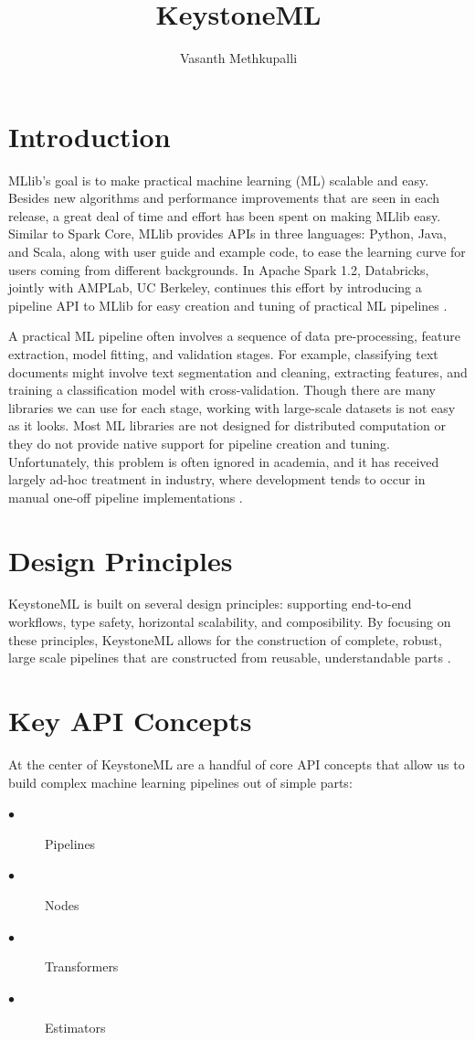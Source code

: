 \documentclass[9pt,twocolumn,twoside]{../../styles/osajnl}
\title{KeystoneML}
\author[1,*]{Vasanth Methkupalli}
\affil[1]{School of Informatics and Computing, Bloomington, IN 47408, U.S.A.}
\affil[*]{Corresponding authors: mvasanthiiit@gmail.com}
\begin{document}
\maketitle

\section{Introduction}

MLlib’s goal is to make practical machine learning (ML) scalable and
easy. Besides new algorithms and performance improvements that are
seen in each release, a great deal of time and effort has been spent
on making MLlib easy. Similar to Spark Core, MLlib provides APIs in
three languages: Python, Java, and Scala, along with user guide and
example code, to ease the learning curve for users coming from
different backgrounds. In Apache Spark 1.2, Databricks, jointly with
AMPLab, UC Berkeley, continues this effort by introducing a pipeline
API to MLlib for easy creation and tuning of practical ML
pipelines \cite{meng2016mllib} .

A practical ML pipeline often involves a sequence of data
pre-processing, feature extraction, model fitting, and validation
stages. For example, classifying text documents might involve text
segmentation and cleaning, extracting features, and training a
classification model with cross-validation. Though there are many
libraries we can use for each stage, working with large-scale datasets
is not easy as it looks. Most ML libraries are not designed for
distributed computation or they do not provide native support for
pipeline creation and tuning. Unfortunately, this problem is often
ignored in academia, and it has received largely ad-hoc treatment in
industry, where development tends to occur in manual one-off pipeline
implementations \cite{meng2016mllib} .

\section{Design Principles}

KeystoneML is built on several design principles: supporting
end-to-end workflows, type safety, horizontal scalability, and
composibility. By focusing on these principles, KeystoneML allows for the
construction of complete, robust, large scale pipelines that are
constructed from reusable, understandable parts \cite{www-keystoneml1} .

\section{Key API Concepts}
At the center of KeystoneML are a handful of core API concepts that
allow us to build complex machine learning pipelines out of simple
parts:
\begin{description}

\item[$\bullet$] Pipelines
\item[$\bullet$] Nodes
\item[$\bullet$] Transformers
\item[$\bullet$] Estimators
  
 
\end{description}
\end{document}
